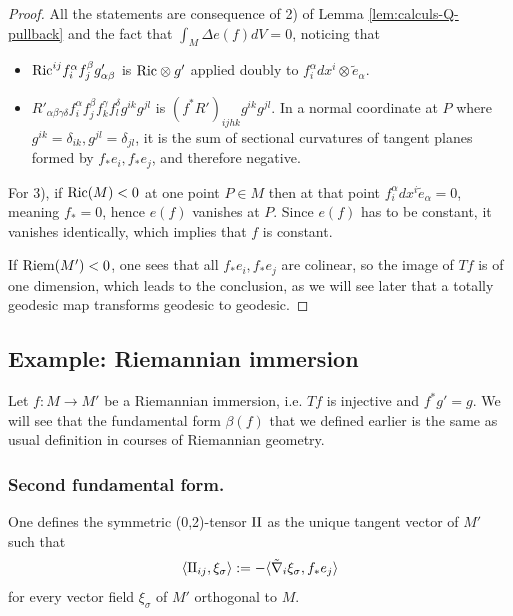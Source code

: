 \begin{proof}
All the statements are consequence of 2) of Lemma \ref{lem:calculs-Q-pullback} and the fact
that \(\int_M \Delta e(f)dV = 0\), noticing that
\begin{itemize}
\item \({\rm Ric}^{ij}f^\alpha_i f^\beta_j g'_{\alpha\beta}\) is \({\rm Ric}\otimes g'\)
applied doubly to \(f_i^\alpha dx^i\otimes\tilde e_\alpha\).
\item \(R'_{\alpha\beta\gamma\delta} f^\alpha_i f^\beta_j f^\gamma_k f^\delta_l
   g^{ik}g^{jl}\) is \((f^* R')_{ijhk}g^{ik}g^{jl}\). In a normal coordinate at \(P\)
where \(g^{ik}=\delta_{ik}, g^{jl}=\delta_{jl}\), it is the sum of sectional curvatures of tangent
planes formed by \(f_*e_i, f_*e_j\), and therefore negative.
\end{itemize}

For 3), if \({\rm Ric}(M)<0\) at one point \(P\in M\) then at that point \(f^\alpha_i dx^i \tilde
e_\alpha =0\), meaning \(f_*=0\), hence \(e(f)\) vanishes at \(P\). Since \(e(f)\) has to be constant, it vanishes identically, which implies that \(f\) is constant.

If \({\rm Riem}(M') < 0\), one sees that all \(f_* e_i, f_* e_j\) are colinear, so the image of \(Tf\) is of one dimension, which leads to the conclusion,
  as we will see later that a totally geodesic map transforms geodesic to geodesic.
\end{proof}



\subsection{Example: Riemannian immersion}
\label{sec:orgfd1fe09}
Let \(f: M \longrightarrow M'\) be a Riemannian immersion, i.e. \(Tf\) is injective and \(f^*g' = g\). We will
see that the fundamental form \(\beta(f)\) that we defined earlier is the same as usual definition in courses of Riemannian geometry.
\subsubsection{Second fundamental form.}
\label{sec:orgd15dfba}
One defines the symmetric (0,2)-tensor \(\sff\) as the unique tangent vector of \(M'\) such that
\[
\langle \sff_{ij},\xi_\sigma \rangle:= -\langle \tilde\nabla_i\xi_\sigma, f_* e_j\rangle
\]
for every vector field \(\xi_\sigma\) of \(M'\) orthogonal to \(M\).

